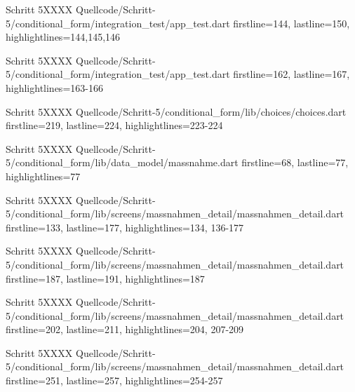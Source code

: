
\begin{alexlistingzwei}{Schritt 5}{XXXX}
    {Quellcode/Schritt-5/conditional_form/integration_test/app_test.dart}
    {firstline=144, lastline=150, highlightlines={144,145,146}}
    \label{lst:Schritt5XXXX}
  \end{alexlistingzwei}

  
\begin{alexlistingzwei}{Schritt 5}{XXXX}
    {Quellcode/Schritt-5/conditional_form/integration_test/app_test.dart}
    {firstline=162, lastline=167, highlightlines={163-166}}
    \label{lst:Schritt5XXXX}
  \end{alexlistingzwei}

  \begin{alexlistingzwei}{Schritt 5}{XXXX}
    {Quellcode/Schritt-5/conditional_form/lib/choices/choices.dart}
    {firstline=219, lastline=224, highlightlines={223-224}}
    \label{lst:Schritt5XXXX}
  \end{alexlistingzwei}

  \begin{alexlistingzwei}{Schritt 5}{XXXX}
    {Quellcode/Schritt-5/conditional_form/lib/data_model/massnahme.dart}
    {firstline=68, lastline=77, highlightlines={77}}
    \label{lst:Schritt5XXXX}
  \end{alexlistingzwei}

  \begin{alexlistingzwei}{Schritt 5}{XXXX}
    {Quellcode/Schritt-5/conditional_form/lib/screens/massnahmen_detail/massnahmen_detail.dart}
    {firstline=133, lastline=177, highlightlines={134, 136-177}}
    \label{lst:Schritt5XXXXX}
  \end{alexlistingzwei}

  \begin{alexlistingzwei}{Schritt 5}{XXXX}
    {Quellcode/Schritt-5/conditional_form/lib/screens/massnahmen_detail/massnahmen_detail.dart}
    {firstline=187, lastline=191, highlightlines={187}}
    \label{lst:Schritt5XXXXX}
  \end{alexlistingzwei}

  \begin{alexlistingzwei}{Schritt 5}{XXXX}
    {Quellcode/Schritt-5/conditional_form/lib/screens/massnahmen_detail/massnahmen_detail.dart}
    {firstline=202, lastline=211, highlightlines={204, 207-209}}
    \label{lst:Schritt5XXXXX}
  \end{alexlistingzwei}

  \begin{alexlistingzwei}{Schritt 5}{XXXX}
    {Quellcode/Schritt-5/conditional_form/lib/screens/massnahmen_detail/massnahmen_detail.dart}
    {firstline=251, lastline=257, highlightlines={254-257}}
    \label{lst:Schritt5XXXXX}
  \end{alexlistingzwei}



